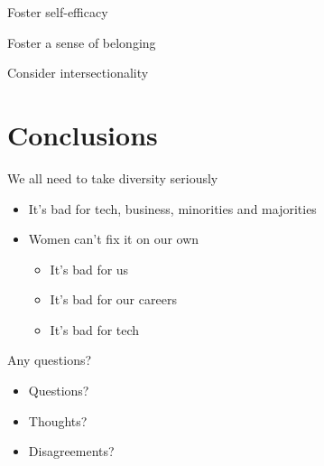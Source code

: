 \documentclass[xcolor=table]{beamer}
\begin{document}
\begin{frame}{Foster self-efficacy}
\end{frame}
\begin{frame}{Foster a sense of belonging}
\end{frame}

\begin{frame}{Consider intersectionality}
\end{frame}

\section{Conclusions}
	\begin{frame}{We all need to take diversity seriously}
		\begin{itemize}
		\item It's bad for tech, business, minorities and majorities 
		\item Women can't fix it on our own
		\begin{itemize}
			\item It's bad for us
			\item It's bad for our careers
			\item It's bad for tech
		\end{itemize}
	\end{itemize}
	\end{frame}
\begin{frame}{Any questions?}

	\begin{itemize}
	\item Questions?
	\item Thoughts?
	\item Disagreements?
	\end{itemize}
\end{frame}
\end{document}

